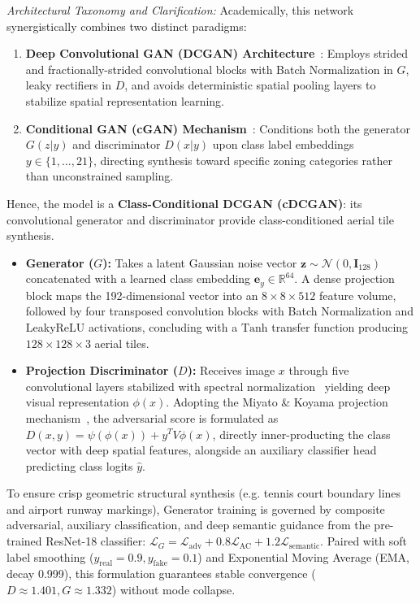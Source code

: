 \documentclass[conference]{IEEEtran}
\begin{document}
\noindent\textit{Architectural Taxonomy and Clarification:} Academically, this network synergistically combines two distinct paradigms:
\begin{enumerate}
    \item \textbf{Deep Convolutional GAN (DCGAN) Architecture}~\cite{radford2015unsupervised}: Employs strided and fractionally-strided convolutional blocks with Batch Normalization in $G$, leaky rectifiers in $D$, and avoids deterministic spatial pooling layers to stabilize spatial representation learning.
    \item \textbf{Conditional GAN (cGAN) Mechanism}~\cite{mirza2014conditional}: Conditions both the generator $G(z|y)$ and discriminator $D(x|y)$ upon class label embeddings $y \in \{1, \dots, 21\}$, directing synthesis toward specific zoning categories rather than unconstrained sampling.
\end{enumerate}
Hence, the model is a \textbf{Class-Conditional DCGAN (cDCGAN)}: its convolutional generator and discriminator provide class-conditioned aerial tile synthesis.

\begin{itemize}
    \item \textbf{Generator ($G$):} Takes a latent Gaussian noise vector $\mathbf{z} \sim \mathcal{N}(0, \mathbf{I}_{128})$ concatenated with a learned class embedding $\mathbf{e}_y \in \mathbb{R}^{64}$. A dense projection block maps the 192-dimensional vector into an $8 \times 8 \times 512$ feature volume, followed by four transposed convolution blocks with Batch Normalization and LeakyReLU activations, concluding with a $\text{Tanh}$ transfer function producing $128 \times 128 \times 3$ aerial tiles.
    \item \textbf{Projection Discriminator ($D$):} Receives image $x$ through five convolutional layers stabilized with spectral normalization~\cite{miyato2018spectral} yielding deep visual representation $\phi(x)$. Adopting the Miyato \& Koyama projection mechanism~\cite{miyato2018cgans}, the adversarial score is formulated as $D(x, y) = \psi(\phi(x)) + y^T V \phi(x)$, directly inner-producting the class vector with deep spatial features, alongside an auxiliary classifier head~\cite{odena2017conditional} predicting class logits $\hat{y}$.
\end{itemize}
To ensure crisp geometric structural synthesis (e.g. tennis court boundary lines and airport runway markings), Generator training is governed by composite adversarial, auxiliary classification, and deep semantic guidance from the pre-trained ResNet-18 classifier: $\mathcal{L}_G = \mathcal{L}_{\text{adv}} + 0.8\mathcal{L}_{\text{AC}} + 1.2\mathcal{L}_{\text{semantic}}$. Paired with soft label smoothing ($y_{\text{real}}=0.9, y_{\text{fake}}=0.1$) and Exponential Moving Average (EMA, decay 0.999), this formulation guarantees stable convergence ($D \approx 1.401, G \approx 1.332$) without mode collapse.
\end{document}
